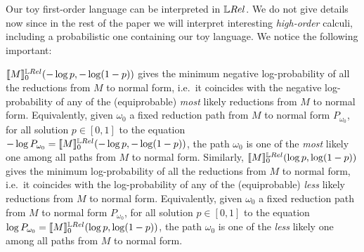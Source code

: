 Our toy first-order language can be interpreted in $\LREL$.
We do not give details now since in the rest of the paper we will interpret interesting \emph{high-order} calculi, including a probabilistic one containing our toy language.
We notice the following important:

\begin{remark}\label{rmk:tropof01Rel}
$\model{M}^{\LREL}_0(-\log p,-\log (1-p))$ gives the minimum negative log-probability of all the reductions from $M$ to normal form, i.e.\ it coincides with the  negative log-probability of any of the (equiprobable) \emph{most} likely reductions from $M$ to normal form.
Equivalently, given $\omega_0$ a fixed reduction path from $M$ to normal form $P_{\omega_0}$, for all solution $p\in[0,1]$ to the equation $%
-\log  P_{\omega_0} = \model{M}^{\LREL}_0(-\log p,-\log (1-p))$, the path $\omega_0$ is one of the \emph{most} likely one among all paths from $M$ to normal form.
Similarly, $\model{M}^{\LREL}_0(\log p,\log (1-p))$ gives the minimum log-probability of all the reductions from $M$ to normal form, i.e.\ it coincides with the log-probability of any of the (equiprobable) \emph{less} likely reductions from $M$ to normal form.
Equivalently, given $\omega_0$ a fixed reduction path from $M$ to normal form $P_{\omega_0}$, for all solution $p\in[0,1]$ to the equation $%
\log  P_{\omega_0} = \model{M}^{\LREL}_0(\log p,\log (1-p))$, the path $\omega_0$ is one of the \emph{less} likely one among all paths from $M$ to normal form.
\end{remark}

